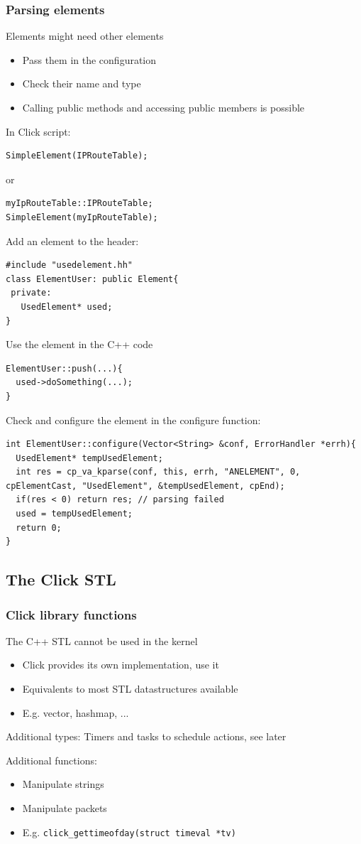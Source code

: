 \documentclass{beamer}
\begin{document}
\begin{frame}
\frametitle{Parsing elements}
Elements might need other elements
\begin{itemize}
	\item Pass them in the configuration
	\item Check their name and type
	\item Calling public methods and accessing public members is possible
\end{itemize}
In Click script: 
\begin{lstlisting}
SimpleElement(IPRouteTable);
\end{lstlisting}
or
\begin{lstlisting}
myIpRouteTable::IPRouteTable;
SimpleElement(myIpRouteTable);
\end{lstlisting}

Add an element to the header:
\begin{lstlisting}
#include "usedelement.hh"
class ElementUser: public Element{
 private: 
   UsedElement* used;
}
\end{lstlisting}

Use the element in the C++ code
\begin{lstlisting}
ElementUser::push(...){
  used->doSomething(...);
}
\end{lstlisting}

\framebreak

Check and configure the element in the configure function:
\begin{lstlisting}
int ElementUser::configure(Vector<String> &conf, ErrorHandler *errh){
  UsedElement* tempUsedElement;
  int res = cp_va_kparse(conf, this, errh, "ANELEMENT", 0, cpElementCast, "UsedElement", &tempUsedElement, cpEnd);
  if(res < 0) return res; // parsing failed
  used = tempUsedElement;
  return 0;
}
\end{lstlisting}
\end{frame}


\subsection{The Click STL} %
\label{sub:the_click_stl}

\begin{frame}
\frametitle{Click library functions}
The C++ STL cannot be used in the kernel
\begin{itemize}
	\item Click provides its own implementation, use it
	\item Equivalents to most STL datastructures available
	\item E.g. vector, hashmap, ...
\end{itemize}
Additional types: Timers and tasks to schedule actions, see later

Additional functions:
\begin{itemize}
	\item Manipulate strings
	\item Manipulate packets
	\item E.g. \lstinline!click_gettimeofday(struct timeval *tv)!
\end{itemize}
\end{frame}
\end{document}
